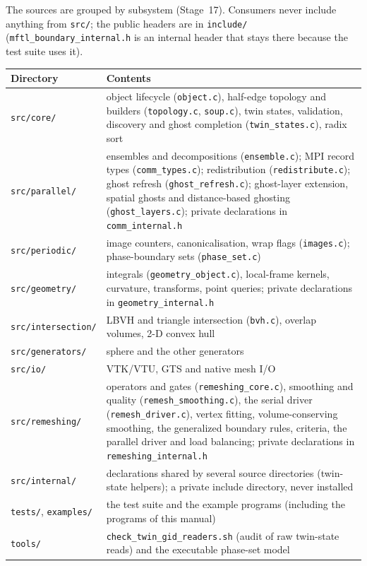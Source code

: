 The sources are grouped by subsystem (Stage~17). Consumers never include anything from
\texttt{src/}; the public headers are in \texttt{include/} (\texttt{mftl\_boundary\_internal.h} is
an internal header that stays there because the test suite uses it).

\begin{center}\small
\begin{tabularx}{\textwidth}{@{}lX@{}}
\toprule
Directory & Contents \\
\midrule
\texttt{src/core/} & object lifecycle (\texttt{object.c}), half-edge topology and builders (\texttt{topology.c}, \texttt{soup.c}), twin states, validation, discovery and ghost completion (\texttt{twin\_states.c}), radix sort \\
\texttt{src/parallel/} & ensembles and decompositions (\texttt{ensemble.c}); MPI record types (\texttt{comm\_types.c}); redistribution (\texttt{redistribute.c}); ghost refresh (\texttt{ghost\_refresh.c}); ghost-layer extension, spatial ghosts and distance-based ghosting (\texttt{ghost\_layers.c}); private declarations in \texttt{comm\_internal.h} \\
\texttt{src/periodic/} & image counters, canonicalisation, wrap flags (\texttt{images.c}); phase-boundary sets (\texttt{phase\_set.c}) \\
\texttt{src/geometry/} & integrals (\texttt{geometry\_object.c}), local-frame kernels, curvature, transforms, point queries; private declarations in \texttt{geometry\_internal.h} \\
\texttt{src/intersection/} & LBVH and triangle intersection (\texttt{bvh.c}), overlap volumes, 2-D convex hull \\
\texttt{src/generators/} & sphere and the other generators \\
\texttt{src/io/} & VTK/VTU, GTS and native mesh I/O \\
\texttt{src/remeshing/} & operators and gates (\texttt{remeshing\_core.c}), smoothing and quality (\texttt{remesh\_smoothing.c}), the serial driver (\texttt{remesh\_driver.c}), vertex fitting, volume-conserving smoothing, the generalized boundary rules, \mftlone{} criteria, the parallel driver and load balancing; private declarations in \texttt{remeshing\_internal.h} \\
\texttt{src/internal/} & declarations shared by several source directories (twin-state helpers); a private include directory, never installed \\
\texttt{tests/}, \texttt{examples/} & the test suite and the example programs (including the programs of this manual) \\
\texttt{tools/} & \texttt{check\_twin\_gid\_readers.sh} (audit of raw twin-state reads) and the executable phase-set model \\
\bottomrule
\end{tabularx}
\end{center}
